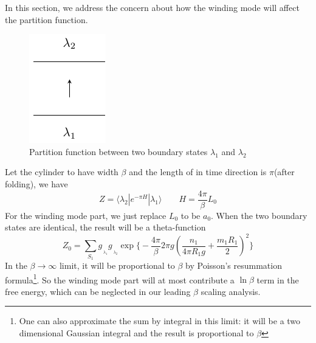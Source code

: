 \documentclass{article}
\begin{document}
In this section, we address the concern about how the winding mode will affect the partition function.
\begin{figure}[h]
\centering
\includegraphics[width=\textwidth]{fig_part-lambda1-lambda2}
\caption{Partition function between two boundary states $\lambda_1$ and $\lambda_2$}
\label{fig:part-lambda1-lambda2}
\end{figure}

Let the cylinder to have width $\beta$ and the length of in time direction is $\pi$(after folding), we have
\begin{equation}
Z = \langle \lambda_2 | e^{-\pi H} | \lambda_1 \rangle   \qquad H = \frac{4\pi}{ \beta} L_0 
\end{equation}
For the winding mode part, we just replace $L_0$ to be $a_0$. When the two boundary states are identical, the result will be a theta-function
\begin{equation}
Z_0 = \sum_{S_1 } g_{\,\!_{\lambda_1} }g_{\,\!_{\lambda_2} } \exp\Big\{- \frac{4\pi}{\beta} 2 \pi g ( \frac{n_1}{ 4 \pi R_1 g} + \frac{m_1 R_1 }{ 2} )^2 \Big\}
\end{equation}
In the $\beta \rightarrow \infty$ limit, it will be proportional to $\beta$ by Poisson's resummation formula\footnote{One can also approximate the sum by integral in this limit: it will be a two dimensional Gaussian integral and the result is proportional to $\beta$}. So the winding mode part will at most contribute a $\ln \beta$ term in the free energy, which can be neglected in our leading $\beta$ scaling analysis. 
\end{document}
